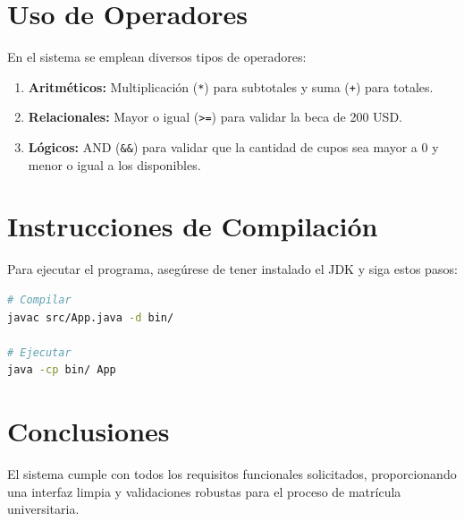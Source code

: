 \documentclass[12pt,a4paper]{article}
\begin{document}
\section{Uso de Operadores}
En el sistema se emplean diversos tipos de operadores:
\begin{enumerate}
    \item \textbf{Aritméticos:} Multiplicación (\texttt{*}) para subtotales y suma (\texttt{+}) para totales.
    \item \textbf{Relacionales:} Mayor o igual (\texttt{>=}) para validar la beca de 200 USD.
    \item \textbf{Lógicos:} AND (\texttt{\&\&}) para validar que la cantidad de cupos sea mayor a 0 y menor o igual a los disponibles.
\end{enumerate}

\section{Instrucciones de Compilación}
Para ejecutar el programa, asegúrese de tener instalado el JDK y siga estos pasos:
\begin{lstlisting}[language=bash]
# Compilar
javac src/App.java -d bin/

# Ejecutar
java -cp bin/ App
\end{lstlisting}

\section{Conclusiones}
El sistema cumple con todos los requisitos funcionales solicitados, proporcionando una interfaz limpia y validaciones robustas para el proceso de matrícula universitaria.
\end{document}
